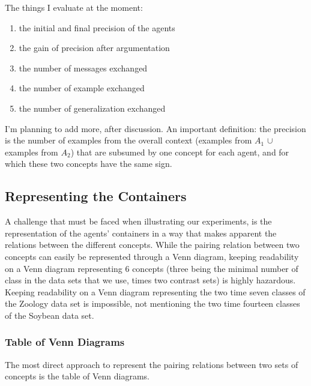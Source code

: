 The things I evaluate at the moment:

\begin{enumerate}
\item the initial and final precision of the agents
\item the gain of precision after argumentation
\item the number of messages exchanged
\item the number of example exchanged
\item the number of generalization exchanged
\end{enumerate}

I'm planning to add more, after discussion. An important definition: the precision is the number of examples from the overall context (examples from $A_{1}$ $\cup$ examples from $A_{2}$) that are subsumed by one concept for each agent, and for which these two concepts have the same sign.

\subsection{Representing the Containers}

A challenge that must be faced when illustrating our experiments, is the representation of the agents' containers in a way that makes apparent the relations between the different concepts. While the pairing relation between two concepts can easily be represented through a Venn diagram, keeping readability on a Venn diagram representing 6 concepts (three being the minimal number of class in the data sets that we use, times two contrast sets) is highly hazardous. Keeping readability on a Venn diagram representing the two time seven classes of the Zoology data set is impossible, not mentioning the two time fourteen classes of the Soybean data set.

\subsubsection{Table of Venn Diagrams}
The most direct approach to represent the pairing relations between two sets of concepts is the table of Venn diagrams. 

